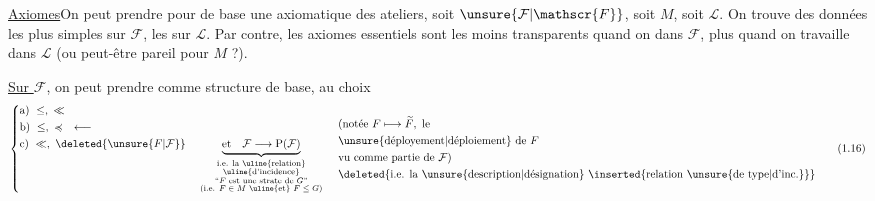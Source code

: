 \uline{Axiomes}\quad On peut prendre pour  de base  une axiomatique des ateliers, soit $\unsure{\mathcal{F}|\mathscr{F}}$, soit $M$, soit $\mathcal{L}$. On trouve des données les plus simples sur $\mathcal{F}$, les   sur $\mathcal{L}$. Par contre, les axiomes essentiels sont les moins transparents quand on   dans $\mathcal{F}$,  plus  quand on travaille dans $\mathcal{L}$ (ou peut-être pareil pour $M$ ?).

\uline{Sur $\mathcal{F}$}, on peut prendre comme structure de base, au choix
\[
\left\{\begin{aligned}
 &\text{a)}\ \leq,\ \ll\\
 &\text{b)}\ \leq,\ \preccurlyeq \quad \longleftarrow\\
 &\text{c)}\ \ll,\ \deleted{\unsure{F|\mathcal F}}\quad
 \underbrace{\text{et}\quad\mathcal{F}\longrightarrow\mathrm{P}(\mathcal{F})}_{
 \begin{smallmatrix}
 \text{i.e. la \uline{relation}}\\[-1pt]
 \text{\uline{d'incidence}}\\
 \text{``$F$ est une strate de $G$''}\\
 \text{(i.e. $F\in M$ \uline{et} $F\leq G$)}
 \end{smallmatrix}}
\end{aligned}\right.
\quad
\begin{aligned}
 &\text{(notée }F\longmapsto\widetilde F,\ \text{le}\\
 &\text{\unsure{déployement|déploiement} de }F\\
 &\text{vu comme partie de }\mathcal{F}\text{)}\\
 &\text{\deleted{i.e. la \unsure{description|désignation} \inserted{relation \unsure{de type|d'inc.}}}}
\end{aligned}
\tag*{(1.16)}
\]

